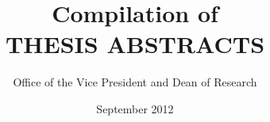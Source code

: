 \newcommand{\graddate}{September 2012}

\title{Compilation of\\ THESIS ABSTRACTS}
\author{Office of the Vice President and Dean of Research}

%
%
\date{\graddate}              %



